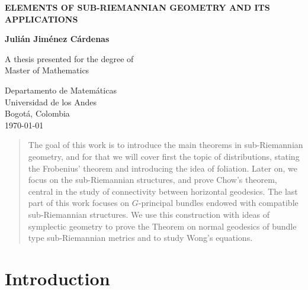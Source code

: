 \documentclass[12pt, letterpaper, reqno]{amsart}
\author{}
\title{}
\theoremstyle{definition}
\theoremstyle{plain}
\theoremstyle{remark}
\begin{document}
\begin{titlepage}
    \begin{center}
        \vspace*{1cm}
            
        \Huge
	\textbf{ELEMENTS OF SUB-RIEMANNIAN GEOMETRY AND ITS APPLICATIONS}
        \vspace{0.5cm}
        \LARGE
            
        \vspace{1.5cm}
            
        \textbf{Julián Jiménez Cárdenas}
            
        \vfill
            
        A thesis presented for the degree of\\
        Master of Mathematics
            
        \vspace{0.8cm}
            
            
        \Large
        Departamento de Matemáticas\\
        Universidad de los Andes\\
        Bogotá, Colombia\\
        \today
            
    \end{center}
\end{titlepage}
\maketitle
\begin{abstract}
	The goal of this work is to introduce the main theorems in sub-Riemannian geometry, and for that we will cover first the topic of distributions, stating the Frobenius' theorem and introducing the idea of foliation. Later on, we focus on the sub-Riemannian structures, and prove Chow's theorem, central in the study of connectivity between horizontal geodesics. The last part of this work focuses on $ G $-principal bundles endowed with compatible sub-Riemannian structures. We use this construction with ideas of symplectic geometry to prove the Theorem on normal geodesics of bundle type sub-Riemannian metrics and to study Wong's equations.
\end{abstract}

\section*{Introduction}
\label{sec:0}
\end{document}
